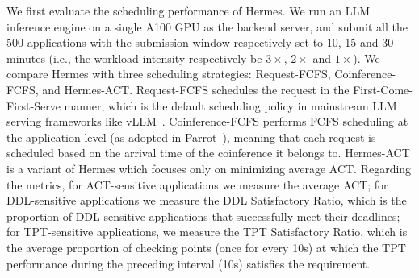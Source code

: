 We first evaluate the scheduling performance of Hermes. 
We run an LLM inference engine on a single A100 GPU as the backend server, and submit all the 500 applications with the submission window respectively set to 10, 15 and 30 minutes (i.e., the workload intensity respectively be $3\times$, $2\times$ and $1\times$). 
We compare Hermes with three scheduling strategies: Request-FCFS, Coinference-FCFS, and Hermes-ACT.
Request-FCFS schedules the request in the First-Come-First-Serve manner, which is the default scheduling policy in mainstream LLM serving frameworks like vLLM~\cite{vllm}.
Coinference-FCFS performs FCFS scheduling at the application level (as adopted in Parrot~\cite{lin2024parrot}), meaning that each request is scheduled based on the arrival time of the coinference it belongs to.
Hermes-ACT is a variant of Hermes which focuses only on minimizing average ACT. 
Regarding the metrics, for ACT-sensitive applications we measure the average ACT; for DDL-sensitive applications we measure the DDL Satisfactory Ratio, which is the proportion of DDL-sensitive applications that successfully meet their deadlines; for TPT-sensitive applications, we measure the TPT Satisfactory Ratio, which is the average proportion of checking points (once for every 10s) at which the TPT performance during the preceding interval (10s) satisfies the requirement.


